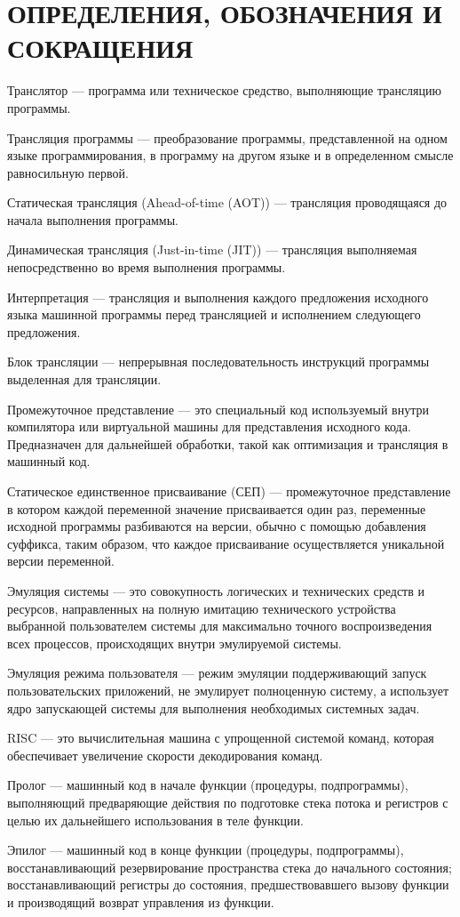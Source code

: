 \section*{ОПРЕДЕЛЕНИЯ, ОБОЗНАЧЕНИЯ И СОКРАЩЕНИЯ}

Транслятор --- программа или техническое средство, выполняющие трансляцию программы. \cite{translate}

Трансляция программы --- преобразование программы, представленной на одном языке программирования, в программу на другом языке и в определенном смысле равносильную первой. \cite{translate}

Статическая трансляция (Ahead-of-time (AOT)) --- трансляция проводящаяся до начала выполнения программы.

Динамическая трансляция (Just-in-time (JIT)) --- трансляция выполняемая непосредственно во время выполнения программы.

Интерпретация --- трансляция и выполнения каждого предложения исходного языка машинной программы перед трансляцией и исполнением следующего предложения. \cite{interpret}

Блок трансляции --- непрерывная последовательность инструкций программы выделенная для трансляции.

Промежуточное представление ---  это специальный код используемый внутри компилятора или виртуальной машины для представления исходного кода. Предназначен для дальнейшей обработки, такой как оптимизация и трансляция в машинный код.

Статическое единственное присваивание (СЕП) --- промежуточное представление в котором каждой переменной значение присваивается один раз, переменные исходной программы разбиваются на версии, обычно с помощью добавления суффикса, таким образом, что каждое присваивание осуществляется уникальной версии переменной.

Эмуляция системы --- это совокупность логических и технических средств и ресурсов, направленных на полную имитацию технического устройства выбранной пользователем системы для максимально точного воспроизведения всех процессов, происходящих внутри эмулируемой системы. 

Эмуляция режима пользователя --- режим эмуляции поддерживающий запуск пользовательских приложений, не эмулирует полноценную систему, а использует ядро запускающей системы для выполнения необходимых системных задач.

RISC --- это вычислительная машина с упрощенной системой команд, которая обеспечивает увеличение скорости декодирования команд. \cite{it_dict}

Пролог --- машинный код в начале функции (процедуры, подпрограммы), выполняющий предваряющие действия по подготовке стека потока и регистров с целью их дальнейшего использования в теле функции. \cite{interpret}

Эпилог --- машинный код в конце функции (процедуры, подпрограммы), восстанавливающий резервирование пространства стека до начального состояния; восстанавливающий регистры до состояния, предшествовавшего вызову функции и производящий возврат управления из функции. \cite{interpret}


\pagebreak